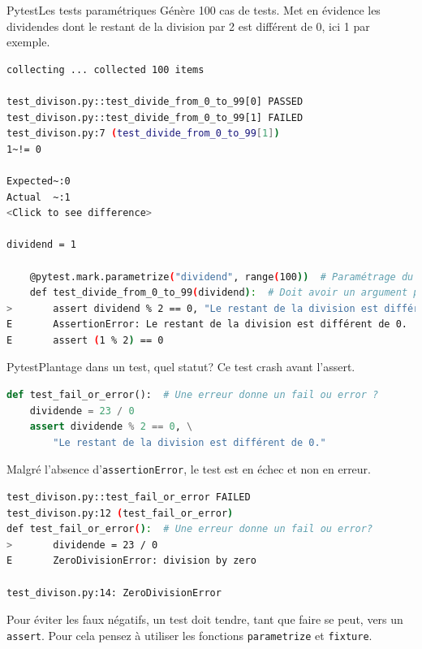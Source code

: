 \documentclass{beamer}
\begin{document}
    \begin{frame}[fragile]{Pytest}{Les tests paramétriques}
        \transdissolve
        Génère 100 cas de tests.
        Met en évidence les dividendes dont le restant de la division par 2 est différent de 0, ici 1 par exemple.
        \begin{lstlisting}[language=sh]
collecting ... collected 100 items

test_divison.py::test_divide_from_0_to_99[0] PASSED                      [  1%]
test_divison.py::test_divide_from_0_to_99[1] FAILED                      [  2%]
test_divison.py:7 (test_divide_from_0_to_99[1])
1~!= 0

Expected~:0
Actual  ~:1
<Click to see difference>

dividend = 1

    @pytest.mark.parametrize("dividend", range(100))  # Paramétrage du test
    def test_divide_from_0_to_99(dividend):  # Doit avoir un argument présent dans le paramétrage
>       assert dividend % 2 == 0, "Le restant de la division est différent de 0."
E       AssertionError: Le restant de la division est différent de 0.
E       assert (1 % 2) == 0
        \end{lstlisting}
    \end{frame}

    \begin{frame}[fragile]{Pytest}{Plantage dans un test, quel statut?}
        \transdissolve
        Ce test crash avant l'assert.
        \begin{lstlisting}[language=Python]
def test_fail_or_error():  # Une erreur donne un fail ou error ?
    dividende = 23 / 0
    assert dividende % 2 == 0, \
        "Le restant de la division est différent de 0."
        \end{lstlisting}
        Malgré l'absence d'\lstinline{assertionError}, le test est en échec et non en erreur.
        \begin{lstlisting}[language=sh]
test_divison.py::test_fail_or_error FAILED                               [100%]
test_divison.py:12 (test_fail_or_error)
def test_fail_or_error():  # Une erreur donne un fail ou error?
>       dividende = 23 / 0
E       ZeroDivisionError: division by zero

test_divison.py:14: ZeroDivisionError
        \end{lstlisting}

        \begin{dangercolorbox}
            Pour éviter les faux négatifs, un test doit tendre, tant que faire se peut, vers un \lstinline{assert}.
            Pour cela pensez à utiliser les fonctions \lstinline{parametrize} et \lstinline{fixture}.
        \end{dangercolorbox}
    \end{frame}
\end{document}
